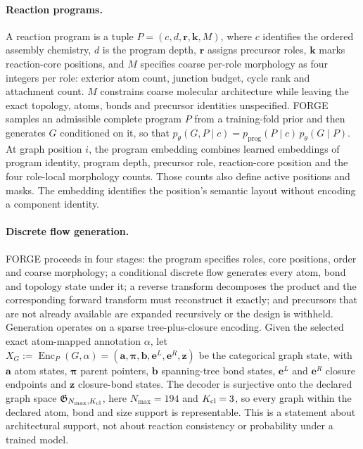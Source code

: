 \documentclass{article}
\begin{document}
\paragraph{Reaction programs.}
A reaction program is a tuple $P=(c,d,\mathbf{r},\mathbf{k},M)$, where $c$ identifies the ordered
assembly chemistry, $d$ is the program depth, $\mathbf{r}$ assigns precursor roles, $\mathbf{k}$
marks reaction-core positions, and $M$ specifies coarse per-role morphology as four integers per
role: exterior atom count, junction budget, cycle rank and attachment count. $M$ constrains coarse
molecular architecture while leaving the exact topology, atoms, bonds and precursor identities
unspecified. FORGE samples an admissible complete program $P$ from a training-fold prior and then
generates $G$ conditioned on it, so that
$p_\theta(G,P\mid c)=p_{\mathrm{prog}}(P\mid c)\,p_\theta(G\mid P)$.
At graph position $i$, the program embedding combines learned embeddings of program identity, program
depth, precursor role, reaction-core position and the four role-local morphology counts. Those counts
also define active positions and masks. The embedding identifies the position's semantic layout
without encoding a component identity.

\paragraph{Discrete flow generation.}
FORGE proceeds in four stages: the program specifies roles, core positions, order and coarse
morphology; a conditional discrete flow generates every atom, bond and topology state under it; a
reverse transform decomposes the product and the corresponding forward transform must reconstruct it
exactly; and precursors that are not already available are expanded recursively or the design is
withheld. Generation operates on a sparse tree-plus-closure encoding. Given the selected exact
atom-mapped annotation $\alpha$, let
$X_G:=\operatorname{Enc}_P(G,\alpha)=(\mathbf{a},\boldsymbol{\pi},\mathbf{b},\mathbf{e}^{L},\mathbf{e}^{R},\mathbf{z})$
be the categorical graph state, with $\mathbf{a}$ atom states, $\boldsymbol{\pi}$ parent pointers,
$\mathbf{b}$ spanning-tree bond states, $\mathbf{e}^{L}$ and $\mathbf{e}^{R}$ closure endpoints and
$\mathbf{z}$ closure-bond states. The decoder is surjective onto the declared graph space
$\mathfrak{G}_{N_{\max},K_{\rm cl}}$, here $N_{\max}=194$ and $K_{\rm cl}=3$, so every graph within the declared atom,
bond and size support is representable. This is a statement about architectural support, not about
reaction consistency or probability under a trained model.
\end{document}
